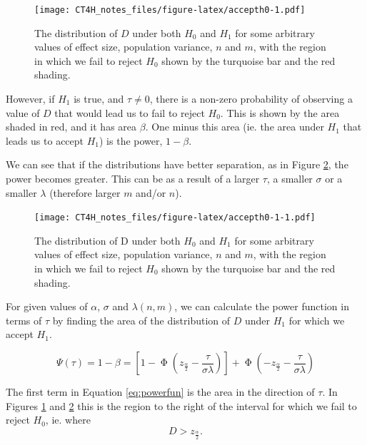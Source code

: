 \documentclass[
  openany]{book}
\theoremstyle{definition}
\theoremstyle{definition}
\theoremstyle{definition}
\theoremstyle{definition}
\theoremstyle{remark}
\begin{document}
\begin{figure}
\centering
\texttt{[image: CT4H\_notes\_files/figure-latex/accepth0-1.pdf]}
\caption{\label{fig:accepth0}The distribution of \(D\) under both \(H_0\) and \(H_1\) for some arbitrary values of effect size, population variance, \(n\) and \(m\), with the region in which we fail to reject \(H_0\) shown by the turquoise bar and the red shading.}
\end{figure}

However, if \(H_1\) is true, and \(\tau\neq{0}\), there is a non-zero probability of observing a value of \(D\) that would lead us to fail to reject \(H_0\). This is shown by the area shaded in red, and it has area \(\beta\). One minus this area (ie. the area under \(H_1\) that leads us to accept \(H_1\)) is the power, \(1-\beta\).

We can see that if the distributions have better separation, as in Figure \ref{fig:accepth0-1}, the power becomes greater. This can be as a result of a larger \(\tau\), a smaller \(\sigma\) or a smaller \(\lambda\) (therefore larger \(m\) and/or \(n\)).

\begin{figure}
\centering
\texttt{[image: CT4H\_notes\_files/figure-latex/accepth0-1-1.pdf]}
\caption{\label{fig:accepth0-1}The distribution of D under both \(H_0\) and \(H_1\) for some arbitrary values of effect size, population variance, \(n\) and \(m\), with the region in which we fail to reject \(H_0\) shown by the turquoise bar and the red shading.}
\end{figure}

For given values of \(\alpha\), \(\sigma\) and \(\lambda\left(n,m\right)\), we can calculate the power function in terms of \(\tau\) by finding the area of the distribution of \(D\) under \(H_1\) for which we accept \(H_1\).

\begin{equation}
\Psi\left(\tau\right) = 1-\beta = \left[1 - \operatorname{\Phi}\left(z_{\frac{\alpha}{2}} - \frac{\tau}{\sigma\lambda}\right)\right] + \operatorname{\Phi}\left(-z_{\frac{\alpha}{2}} - \frac{\tau}{\sigma\lambda}\right)
\label{eq:powerfun}
\end{equation}

The first term in Equation \eqref{eq:powerfun} is the area in the direction of \(\tau\). In Figures \ref{fig:accepth0} and \ref{fig:accepth0-1} this is the region to the right of the interval for which we fail to reject \(H_0\), ie. where \[D > z_{\frac{\alpha}{2}}.\]
\end{document}
